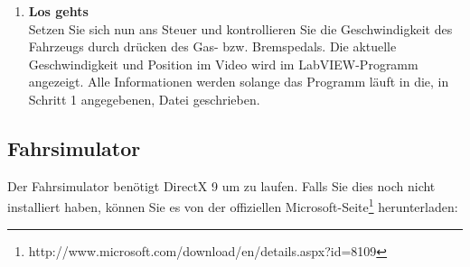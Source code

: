 \begin{enumerate}[label=\arabic*.]
\item \textbf{Los gehts}\\
Setzen Sie sich nun ans Steuer und kontrollieren Sie die Geschwindigkeit des Fahrzeugs durch drücken des Gas- bzw. Bremspedals. Die aktuelle Geschwindigkeit und Position im Video wird im LabVIEW-Programm angezeigt. Alle Informationen werden solange das Programm läuft in die, in Schritt 1 angegebenen, Datei geschrieben.
	
\end{enumerate}

\subsection{Fahrsimulator}
Der Fahrsimulator benötigt DirectX 9 um zu laufen. Falls Sie dies noch nicht installiert haben, können Sie es von der offiziellen Microsoft-Seite\footnote{http://www.microsoft.com/download/en/details.aspx?id=8109} herunterladen: 

